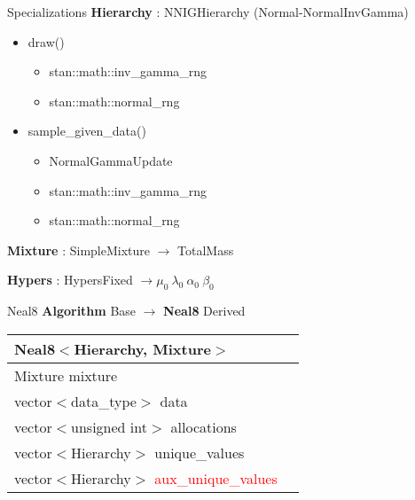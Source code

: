 \begin{frame}{Specializations}
\textbf{Hierarchy} : NNIGHierarchy (Normal-NormalInvGamma)
	\begin{itemize}
		\item draw()
		\begin{itemize}
			\item stan::math::inv\_gamma\_rng
			\item stan::math::normal\_rng
		\end{itemize}
		\item sample\_given\_data()
		\begin{itemize}
			\item NormalGammaUpdate
			\item stan::math::inv\_gamma\_rng
			\item stan::math::normal\_rng
		\end{itemize}
	\end{itemize}
\textbf{Mixture} : SimpleMixture $ \rightarrow$ TotalMass

\textbf{Hypers} : HypersFixed $ \rightarrow \mu_0 \ \lambda_0 \ \alpha_0 \ \beta_0 $

\end{frame}

\begin{frame}{Neal8}
 \textbf{Algorithm} Base $\rightarrow$ \textbf{Neal8} Derived

\begin{center}
\begin{tabular}{ | l | c| } 
\hline
 Neal8$<$Hierarchy, Mixture$>$ \\
\hline
 Mixture mixture\\
 vector$<$data\_type$>$ data  \\ 
 vector$<$unsigned int$>$ allocations  \\
 vector$<$Hierarchy$>$ unique\_values \\
 vector$<$Hierarchy$>$ \textcolor{red}{aux\_unique\_values} \\
\hline
\end{tabular}
\end{center}

\end{frame}

